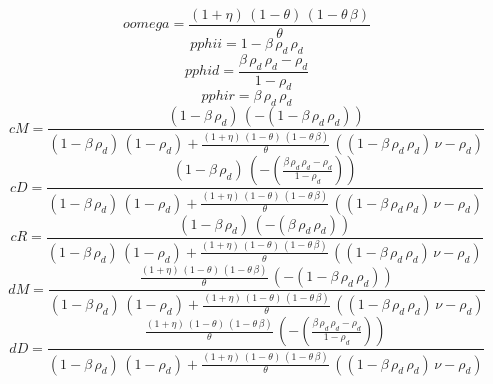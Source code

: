 \begin{dmath*}
oomega = \frac{\left(1+{\eta}\right)\, \left(1-{\theta}\right)\, \left(1-{\theta}\, {\beta}\right)}{{\theta}}
\end{dmath*}
\begin{dmath*}
pphii = 1-{\beta}\, {\rho_d}\, {\rho_d}
\end{dmath*}
\begin{dmath*}
pphid = \frac{{\beta}\, {\rho_d}\, {\rho_d}-{\rho_d}}{1-{\rho_d}}
\end{dmath*}
\begin{dmath*}
pphir = {\beta}\, {\rho_d}\, {\rho_d}
\end{dmath*}
\begin{dmath*}
cM = \frac{\left(1-{\beta}\, {\rho_d}\right)\, \left(-\left(1-{\beta}\, {\rho_d}\, {\rho_d}\right)\right)}{\left(1-{\beta}\, {\rho_d}\right)\, \left(1-{\rho_d}\right)+\frac{\left(1+{\eta}\right)\, \left(1-{\theta}\right)\, \left(1-{\theta}\, {\beta}\right)}{{\theta}}\, \left(\left(1-{\beta}\, {\rho_d}\, {\rho_d}\right)\, {\nu}-{\rho_d}\right)}
\end{dmath*}
\begin{dmath*}
cD = \frac{\left(1-{\beta}\, {\rho_d}\right)\, \left(-\left(\frac{{\beta}\, {\rho_d}\, {\rho_d}-{\rho_d}}{1-{\rho_d}}\right)\right)}{\left(1-{\beta}\, {\rho_d}\right)\, \left(1-{\rho_d}\right)+\frac{\left(1+{\eta}\right)\, \left(1-{\theta}\right)\, \left(1-{\theta}\, {\beta}\right)}{{\theta}}\, \left(\left(1-{\beta}\, {\rho_d}\, {\rho_d}\right)\, {\nu}-{\rho_d}\right)}
\end{dmath*}
\begin{dmath*}
cR = \frac{\left(1-{\beta}\, {\rho_d}\right)\, \left(-\left({\beta}\, {\rho_d}\, {\rho_d}\right)\right)}{\left(1-{\beta}\, {\rho_d}\right)\, \left(1-{\rho_d}\right)+\frac{\left(1+{\eta}\right)\, \left(1-{\theta}\right)\, \left(1-{\theta}\, {\beta}\right)}{{\theta}}\, \left(\left(1-{\beta}\, {\rho_d}\, {\rho_d}\right)\, {\nu}-{\rho_d}\right)}
\end{dmath*}
\begin{dmath*}
dM = \frac{\frac{\left(1+{\eta}\right)\, \left(1-{\theta}\right)\, \left(1-{\theta}\, {\beta}\right)}{{\theta}}\, \left(-\left(1-{\beta}\, {\rho_d}\, {\rho_d}\right)\right)}{\left(1-{\beta}\, {\rho_d}\right)\, \left(1-{\rho_d}\right)+\frac{\left(1+{\eta}\right)\, \left(1-{\theta}\right)\, \left(1-{\theta}\, {\beta}\right)}{{\theta}}\, \left(\left(1-{\beta}\, {\rho_d}\, {\rho_d}\right)\, {\nu}-{\rho_d}\right)}
\end{dmath*}
\begin{dmath*}
dD = \frac{\frac{\left(1+{\eta}\right)\, \left(1-{\theta}\right)\, \left(1-{\theta}\, {\beta}\right)}{{\theta}}\, \left(-\left(\frac{{\beta}\, {\rho_d}\, {\rho_d}-{\rho_d}}{1-{\rho_d}}\right)\right)}{\left(1-{\beta}\, {\rho_d}\right)\, \left(1-{\rho_d}\right)+\frac{\left(1+{\eta}\right)\, \left(1-{\theta}\right)\, \left(1-{\theta}\, {\beta}\right)}{{\theta}}\, \left(\left(1-{\beta}\, {\rho_d}\, {\rho_d}\right)\, {\nu}-{\rho_d}\right)}
\end{dmath*}
